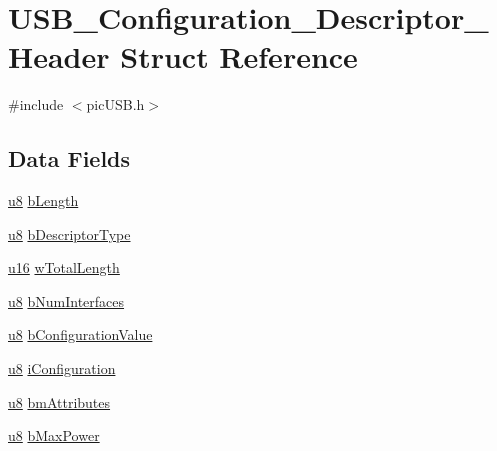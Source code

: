 \hypertarget{struct_u_s_b___configuration___descriptor___header}{\section{U\-S\-B\-\_\-\-Configuration\-\_\-\-Descriptor\-\_\-\-Header Struct Reference}
\label{struct_u_s_b___configuration___descriptor___header}
}


{\ttfamily \#include $<$pic\-U\-S\-B.\-h$>$}

\subsection*{Data Fields}
\begin{DoxyCompactItemize}
\item 
\hyperlink{p8_2pinguino_2core_2typedef_8h_aed742c436da53c1080638ce6ef7d13de}{u8} \hyperlink{struct_u_s_b___configuration___descriptor___header_a904ce9aea3e1db94a9a1ec5a0a22b65d}{b\-Length}
\item 
\hyperlink{p8_2pinguino_2core_2typedef_8h_aed742c436da53c1080638ce6ef7d13de}{u8} \hyperlink{struct_u_s_b___configuration___descriptor___header_af6d6c7e334878414c973fc10e54cfb4e}{b\-Descriptor\-Type}
\item 
\hyperlink{p8_2pinguino_2core_2typedef_8h_a50b0d1c7a54fa09a64a3ac111c778520}{u16} \hyperlink{struct_u_s_b___configuration___descriptor___header_a839de5e515458f253878f84601db72ee}{w\-Total\-Length}
\item 
\hyperlink{p8_2pinguino_2core_2typedef_8h_aed742c436da53c1080638ce6ef7d13de}{u8} \hyperlink{struct_u_s_b___configuration___descriptor___header_a95e07e6c1b3f47969801be56a187e9f2}{b\-Num\-Interfaces}
\item 
\hyperlink{p8_2pinguino_2core_2typedef_8h_aed742c436da53c1080638ce6ef7d13de}{u8} \hyperlink{struct_u_s_b___configuration___descriptor___header_a5cb9f9fbdc2e09c5d8b602ad41996186}{b\-Configuration\-Value}
\item 
\hyperlink{p8_2pinguino_2core_2typedef_8h_aed742c436da53c1080638ce6ef7d13de}{u8} \hyperlink{struct_u_s_b___configuration___descriptor___header_a836aa4bfb503b80ec1fefbc48b13494a}{i\-Configuration}
\item 
\hyperlink{p8_2pinguino_2core_2typedef_8h_aed742c436da53c1080638ce6ef7d13de}{u8} \hyperlink{struct_u_s_b___configuration___descriptor___header_a2733c047911192e6e1630eb85167cd42}{bm\-Attributes}
\item 
\hyperlink{p8_2pinguino_2core_2typedef_8h_aed742c436da53c1080638ce6ef7d13de}{u8} \hyperlink{struct_u_s_b___configuration___descriptor___header_a4ff1fe48c47528b125bf17b470c5af44}{b\-Max\-Power}
\end{DoxyCompactItemize}


